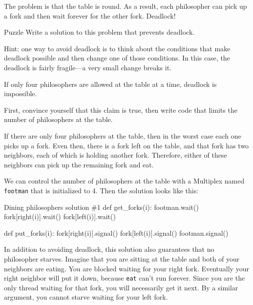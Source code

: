 The problem is that the table is round.  As a result, each philosopher
can pick up a fork and then wait forever for the other fork.  Deadlock!

\begin{puzzlebox}{Puzzle}
Write a solution to this problem that prevents deadlock.

Hint: one way to avoid deadlock is to think about the conditions
that make deadlock possible and then change one of those conditions.
In this case, the deadlock is fairly fragile---a very small change
breaks it.


If only four philosophers are allowed at the table at a time,
deadlock is impossible.

First, convince yourself that this claim is true, then write code that
limits the number of philosophers at the table.
\end{puzzlebox}



If there are only four philosophers at the table, then in the
worst case each one picks up a fork.  Even then, there is a fork
left on the table, and that fork has two neighbors, each of
which is holding another fork.  Therefore, either of these
neighbors can pick up the remaining fork and eat.

We can control the number of philosophers at the table with
a Multiplex named {\tt footman} that is initialized to 4.
Then the solution looks like this:

\begin{lstbox}{Dining philosophers solution \#1}
def get_forks(i):
    footman.wait()
    fork[right(i)].wait()
    fork[left(i)].wait()

def put_forks(i):
    fork[right(i)].signal()
    fork[left(i)].signal()
    footman.signal()
\end{lstbox}

In addition to avoiding deadlock, this solution also guarantees that
no philosopher starves.
Imagine that you
are sitting at the table and both of your neighbors are eating.  You
are blocked waiting for your right fork.  Eventually your right
neighbor will put it down, because {\tt eat} can't run forever.  Since
you are the only thread waiting for that fork, you will necessarily
get it next.  By a similar argument, you cannot starve waiting for
your left fork.

